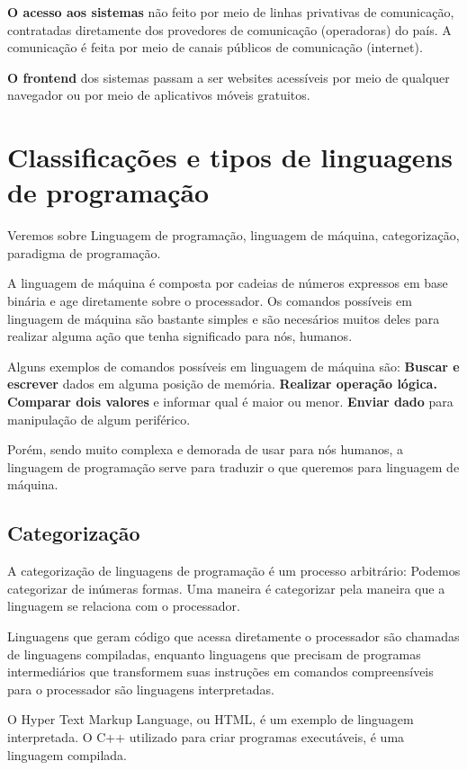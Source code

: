 \documentclass[12pt]{article}
\begin{document}
\textbf{O acesso aos sistemas} não feito 
por meio de linhas privativas de comunicação, contratadas diretamente dos provedores 
de comunicação (operadoras) do país. 
A comunicação é feita por meio de canais públicos de comunicação (internet).

\textbf{O frontend} dos sistemas passam a ser websites acessíveis por meio de qualquer navegador
ou por meio de aplicativos móveis gratuitos.

\indent
\section{Classificações e tipos de linguagens de programação}
Veremos sobre Linguagem de programação, linguagem de máquina, 
categorização, paradigma de programação.

A linguagem de máquina é composta por cadeias de números expressos em base binária
e age diretamente sobre o processador. Os comandos possíveis em linguagem de máquina
são bastante simples e são necesários muitos deles para realizar alguma ação 
que tenha significado para nós, humanos.

Alguns exemplos de comandos possíveis em linguagem de máquina são:
\textbf{Buscar e escrever} dados em alguma posição de memória.
\textbf{Realizar operação lógica.}
\textbf{Comparar dois valores} e informar qual é maior ou menor.
\textbf{Enviar dado} para manipulação de algum periférico.

Porém, sendo muito complexa e demorada de usar para nós humanos, a linguagem
de programação serve para traduzir o que queremos para linguagem de máquina.

\subsection{Categorização}
A categorização de linguagens de programação é um processo arbitrário: Podemos
categorizar de inúmeras formas. Uma maneira é categorizar pela maneira que a linguagem
se relaciona com o processador. 

Linguagens que geram código que acessa diretamente o 
processador são chamadas de linguagens compiladas, enquanto linguagens que precisam
de programas intermediários que transformem suas instruções em comandos compreensíveis
para o processador são linguagens interpretadas.

O Hyper Text Markup Language, ou HTML, é um exemplo de linguagem interpretada. O C++
utilizado para criar programas executáveis, é uma linguagem compilada.
\end{document}
